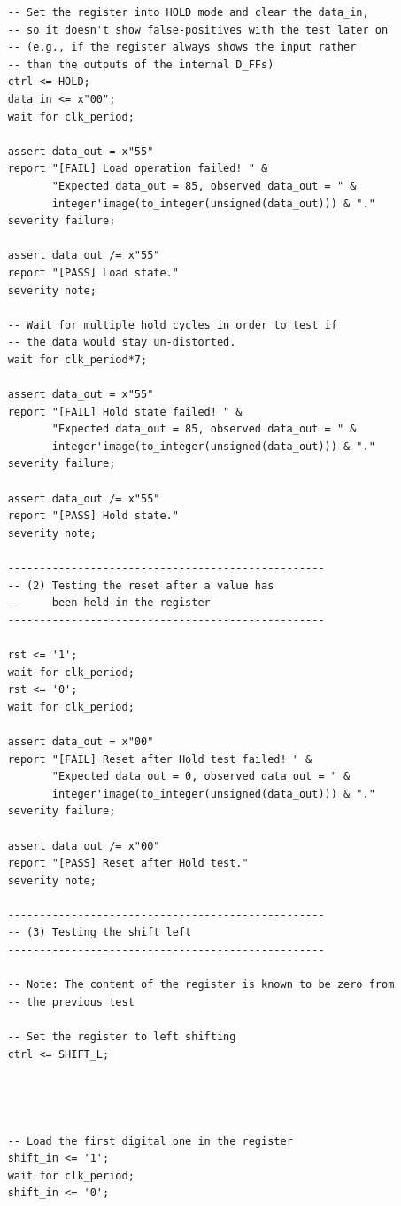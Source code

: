 \documentclass[10pt]{article}
\begin{document}
\begin{verbatim}
    -- Set the register into HOLD mode and clear the data_in, 
    -- so it doesn't show false-positives with the test later on
    -- (e.g., if the register always shows the input rather 
    -- than the outputs of the internal D_FFs) 
    ctrl <= HOLD;
    data_in <= x"00";
    wait for clk_period;
    
    assert data_out = x"55"
    report "[FAIL] Load operation failed! " &
           "Expected data_out = 85, observed data_out = " & 
           integer'image(to_integer(unsigned(data_out))) & "."
    severity failure;
    
    assert data_out /= x"55"
    report "[PASS] Load state."
    severity note;
   
    -- Wait for multiple hold cycles in order to test if 
    -- the data would stay un-distorted.
    wait for clk_period*7;

    assert data_out = x"55"
    report "[FAIL] Hold state failed! " &
           "Expected data_out = 85, observed data_out = " & 
           integer'image(to_integer(unsigned(data_out))) & "."
    severity failure;
    
    assert data_out /= x"55"
    report "[PASS] Hold state."
    severity note;
    
    --------------------------------------------------
    -- (2) Testing the reset after a value has
    --     been held in the register
    --------------------------------------------------
    
    rst <= '1';
    wait for clk_period;
    rst <= '0';
    wait for clk_period;
    
    assert data_out = x"00"
    report "[FAIL] Reset after Hold test failed! " &
           "Expected data_out = 0, observed data_out = " & 
           integer'image(to_integer(unsigned(data_out))) & "."
    severity failure;
    
    assert data_out /= x"00"
    report "[PASS] Reset after Hold test."
    severity note;
    
    --------------------------------------------------
    -- (3) Testing the shift left
    --------------------------------------------------
    
    -- Note: The content of the register is known to be zero from 
    -- the previous test
    
    -- Set the register to left shifting
    ctrl <= SHIFT_L; 
   
    
    
    
    -- Load the first digital one in the register
    shift_in <= '1'; 
    wait for clk_period;
    shift_in <= '0';
    

\end{verbatim}
\end{document}
